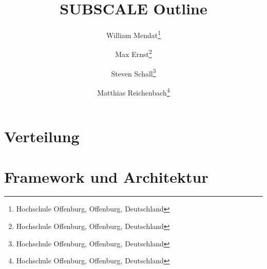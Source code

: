 \documentclass[]{lni}
\begin{document}
\title[SUBSCALE]{SUBSCALE Outline}
    \author[William Mendat \and Max Ernst \and Steven Schall \and Matthias Reichenbach]
    {William Mendat\footnote{Hochschule Offenburg, Offenburg,
        Deutschland } \and
    Max Ernst\footnote{Hochschule Offenburg, Offenburg,
        Deutschland } \and
    Steven Schall\footnote{Hochschule Offenburg, Offenburg,
        Deutschland } \and
    Matthias Reichenbach\footnote{Hochschule Offenburg, Offenburg,
        Deutschland }}
    \maketitle

	\section{Verteilung}
		
		
		
		
	\section{Framework und Architektur}
    	
    	
    	
    	


\end{document}
